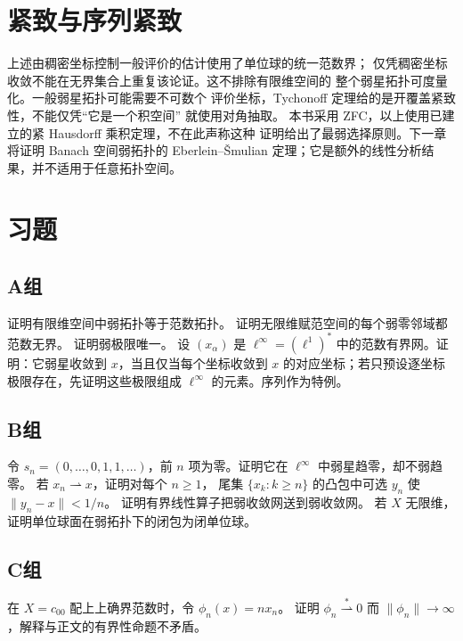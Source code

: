 \section{紧致与序列紧致}

上述由稠密坐标控制一般评价的估计使用了单位球的统一范数界；
仅凭稠密坐标收敛不能在无界集合上重复该论证。这不排除有限维空间的
整个弱星拓扑可度量化。一般弱星拓扑可能需要不可数个
评价坐标，Tychonoff 定理给的是开覆盖紧致性，不能仅凭“它是一个积空间”
就使用对角抽取。
本书采用 ZFC，以上使用已建立的紧 Hausdorff 乘积定理，不在此声称这种
证明给出了最弱选择原则。下一章将证明 Banach 空间弱拓扑的
Eberlein--Šmulian 定理；它是额外的线性分析结果，并不适用于任意拓扑空间。

\section*{习题}
\subsection*{A组}
\begin{enumerate}[label=\textbf{\thechapter.\arabic*.}]
证明有限维空间中弱拓扑等于范数拓扑。
证明无限维赋范空间的每个弱零邻域都范数无界。
证明弱极限唯一。
设 \((x_\alpha)\) 是 \(\ell^\infty=(\ell^1)^*\)
中的范数有界网。证明：它弱星收敛到 \(x\)，当且仅当每个坐标收敛到
\(x\) 的对应坐标；若只预设逐坐标极限存在，先证明这些极限组成
\(\ell^\infty\) 的元素。序列作为特例。
\end{enumerate}
\subsection*{B组}
\begin{enumerate}[label=\textbf{\thechapter.\arabic*.},resume]
令 \(s_n=(0,\ldots,0,1,1,\ldots)\)，前 \(n\) 项为零。证明它在 \(\ell^\infty\) 中弱星趋零，却不弱趋零。
若 \(x_n\rightharpoonup x\)，证明对每个 \(n\ge1\)，
尾集 \(\{x_k:k\ge n\}\) 的凸包中可选 \(y_n\) 使 \(\|y_n-x\|<1/n\)。
证明有界线性算子把弱收敛网送到弱收敛网。
若 \(X\) 无限维，证明单位球面在弱拓扑下的闭包为闭单位球。
\end{enumerate}
\subsection*{C组}
\begin{enumerate}[label=\textbf{\thechapter.\arabic*.},resume]
在 \(X=c_{00}\) 配上上确界范数时，令 \(\phi_n(x)=nx_n\)。
证明 \(\phi_n\overset{*}{\rightharpoonup}0\) 而 \(\|\phi_n\|\to\infty\)，解释与正文的有界性命题不矛盾。
\end{enumerate}
